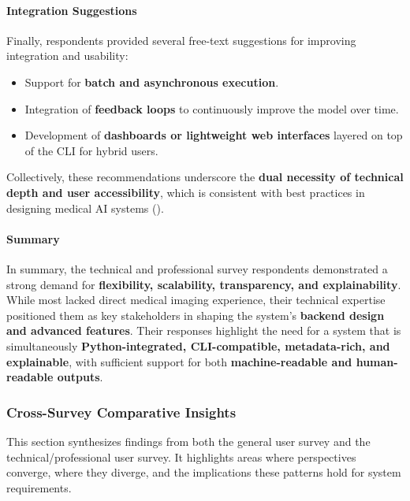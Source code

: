 \documentclass[
  12pt,
  oneside]{article}
\providecommand{\tightlist}{%
  \setlength{\itemsep}{0pt}\setlength{\parskip}{0pt}}
\begin{document}
\paragraph{Integration Suggestions}\label{integration-suggestions}

Finally, respondents provided several free-text suggestions for
improving integration and usability:

\begin{itemize}
\tightlist
\item
  Support for \textbf{batch and asynchronous execution}.
\item
  Integration of \textbf{feedback loops} to continuously improve the
  model over time.
\item
  Development of \textbf{dashboards or lightweight web interfaces}
  layered on top of the CLI for hybrid users.
\end{itemize}

Collectively, these recommendations underscore the \textbf{dual
necessity of technical depth and user accessibility}, which is
consistent with best practices in designing medical AI systems
().

\paragraph{Summary}\label{summary-1}

In summary, the technical and professional survey respondents
demonstrated a strong demand for \textbf{flexibility, scalability,
transparency, and explainability}. While most lacked direct medical
imaging experience, their technical expertise positioned them as key
stakeholders in shaping the system's \textbf{backend design and advanced
features}. Their responses highlight the need for a system that is
simultaneously \textbf{Python-integrated, CLI-compatible, metadata-rich,
and explainable}, with sufficient support for both
\textbf{machine-readable and human-readable outputs}.

\subsubsection{Cross-Survey Comparative
Insights}\label{cross-survey-comparative-insights}

This section synthesizes findings from both the general user survey and
the technical/professional user survey. It highlights areas where
perspectives converge, where they diverge, and the implications these
patterns hold for system requirements.
\end{document}
